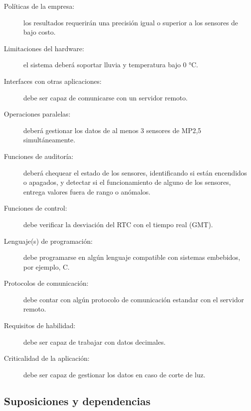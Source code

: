 \documentclass[
11pt, %
codirector, %
]{charter}
\begin{document}

\begin{description}
	\item[Políticas de la empresa:] los resultados requerirán una precisión igual o superior a los sensores de bajo costo.
	\item[Limitaciones del hardware:] el sistema deberá soportar lluvia y temperatura bajo 0 °C.
	\item[Interfaces con otras aplicaciones:] debe ser capaz de comunicarse con un servidor remoto.
	\item[Operaciones paralelas:] deberá gestionar los datos de al menos 3 sensores de MP2,5 simultáneamente.
	\item[Funciones de auditoría:] deberá chequear el estado de los sensores, identificando si están encendidos o apagados, y detectar si el funcionamiento de alguno de los sensores, entrega valores fuera de rango o anómalos.
	\item[Funciones de control:] debe verificar la desviación del RTC con el tiempo real (GMT).
	\item[Lenguaje(s) de programación:] debe programarse en algún lenguaje compatible con sistemas embebidos, por ejemplo, C.
	\item[Protocolos de comunicación:] debe contar con algún protocolo de comunicación estandar con el servidor remoto.
	\item[Requisitos de habilidad:] debe ser capaz de trabajar con datos decimales.
	\item[Criticalidad de la aplicación:] debe ser capaz de gestionar los datos en caso de corte de luz.
\end{description}


\subsection{Suposiciones y dependencias}
\label{sec:org0ae23fe}

\end{document}
